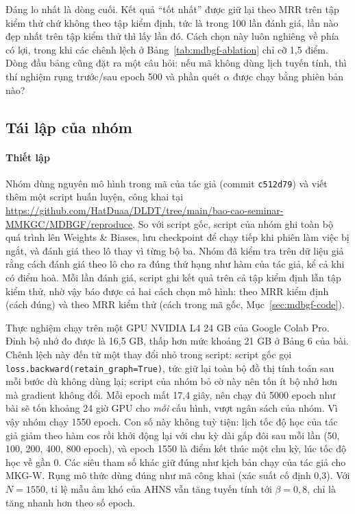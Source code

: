 \documentclass[conference,a4paper]{IEEEtran}
\begin{document}
Đáng lo nhất là dòng cuối. Kết quả ``tốt nhất'' được giữ lại theo MRR trên tập kiểm thử chứ không theo tập kiểm định, tức là trong 100 lần đánh giá, lần nào đẹp nhất trên tập kiểm thử thì lấy lần đó. Cách chọn này luôn nghiêng về phía có lợi, trong khi các chênh lệch ở Bảng~\ref{tab:mdbgf-ablation} chỉ cỡ 1{,}5 điểm. Dòng đầu bảng cũng đặt ra một câu hỏi: nếu mã không dùng lịch tuyến tính, thì thí nghiệm rụng trước/sau epoch 500 và phần quét $\alpha$ được chạy bằng phiên bản nào?

\subsection{Tái lập của nhóm}
\label{sec:mdbgf-repro}

\paragraph{Thiết lập} Nhóm dùng nguyên mô hình trong mã của tác giả (commit \texttt{c512d79}) và viết thêm một script huấn luyện, công khai tại \url{https://github.com/HatDuaa/DLDT/tree/main/bao-cao-seminar-MMKGC/MDBGF/reproduce}. So với script gốc, script của nhóm ghi toàn bộ quá trình lên Weights \& Biases, lưu checkpoint để chạy tiếp khi phiên làm việc bị ngắt, và đánh giá theo lô thay vì từng bộ ba. Nhóm đã kiểm tra trên dữ liệu giả rằng cách đánh giá theo lô cho ra đúng thứ hạng như hàm của tác giả, kể cả khi có điểm hoà. Mỗi lần đánh giá, script ghi kết quả trên cả tập kiểm định lẫn tập kiểm thử, nhờ vậy báo được cả hai cách chọn mô hình: theo MRR kiểm định (cách đúng) và theo MRR kiểm thử (cách trong mã gốc, Mục~\ref{sec:mdbgf-code}).

Thực nghiệm chạy trên một GPU NVIDIA L4 24 GB của Google Colab Pro. Đỉnh bộ nhớ đo được là 16{,}5 GB, thấp hơn mức khoảng 21 GB ở Bảng 6 của bài. Chênh lệch này đến từ một thay đổi nhỏ trong script: script gốc gọi \texttt{loss.backward(retain\_graph=True)}, tức giữ lại toàn bộ đồ thị tính toán sau mỗi bước dù không dùng lại; script của nhóm bỏ cờ này nên tốn ít bộ nhớ hơn mà gradient không đổi. Mỗi epoch mất 17{,}4 giây, nên chạy đủ 5000 epoch như bài sẽ tốn khoảng 24 giờ GPU cho \emph{mỗi} cấu hình, vượt ngân sách của nhóm. Vì vậy nhóm chạy 1550 epoch. Con số này không tuỳ tiện: lịch tốc độ học của tác giả giảm theo hàm cos rồi khởi động lại với chu kỳ dài gấp đôi sau mỗi lần (50, 100, 200, 400, 800 epoch), và epoch 1550 là điểm kết thúc một chu kỳ, lúc tốc độ học về gần 0. Các siêu tham số khác giữ đúng như kịch bản chạy của tác giả cho MKG-W. Rụng mô thức dùng đúng như mã công khai (xác suất cố định 0{,}3). Với $N = 1550$, tỉ lệ mẫu âm khó của AHNS vẫn tăng tuyến tính tới $\beta = 0{,}8$, chỉ là tăng nhanh hơn theo số epoch.
\end{document}
